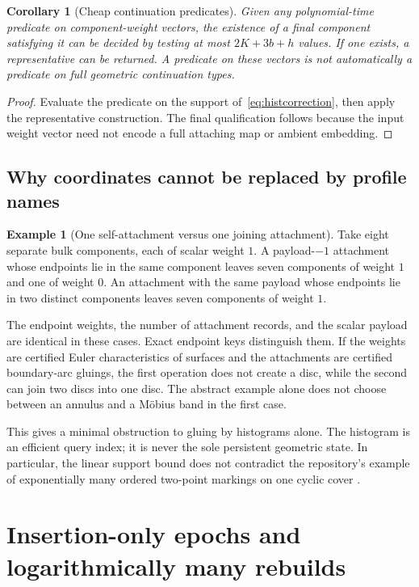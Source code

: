 \documentclass[11pt]{article}
\newtheorem{corollary}[theorem]{Corollary}
\theoremstyle{definition}
\newtheorem{example}[theorem]{Example}
\begin{document}
\begin{corollary}[Cheap continuation predicates]
Given any polynomial-time predicate on component-weight vectors, the existence of a final component satisfying it can be decided by testing at most $2K+3b+h$ values. If one exists, a representative can be returned. A predicate on these vectors is not automatically a predicate on full geometric continuation types.
\end{corollary}
\begin{proof}
Evaluate the predicate on the support of~\eqref{eq:histcorrection}, then apply the representative construction. The final qualification follows because the input weight vector need not encode a full attaching map or ambient embedding.
\end{proof}

\subsection{Why coordinates cannot be replaced by profile names}
\begin{example}[One self-attachment versus one joining attachment]
\label{ex:attachment}
Take eight separate bulk components, each of scalar weight $1$. A payload-$-1$ attachment whose endpoints lie in the same component leaves seven components of weight $1$ and one of weight $0$. An attachment with the same payload whose endpoints lie in two distinct components leaves seven components of weight $1$.

The endpoint weights, the number of attachment records, and the scalar payload are identical in these cases. Exact endpoint keys distinguish them. If the weights are certified Euler characteristics of surfaces and the attachments are certified boundary-arc gluings, the first operation does not create a disc, while the second can join two discs into one disc. The abstract example alone does not choose between an annulus and a M\"obius band in the first case.
\end{example}

This gives a minimal obstruction to gluing by histograms alone. The histogram is an efficient query index; it is never the sole persistent geometric state. In particular, the linear support bound does not contradict the repository's example of exponentially many ordered two-point markings on one cyclic cover \cite{repo-theory}.

\section{Insertion-only epochs and logarithmically many rebuilds}
\label{sec:epochs}
\end{document}
